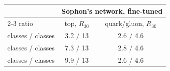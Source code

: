 \begin{table}[t]
\par\bigskip
\begin{tabular*}{\linewidth}{@{\extracolsep{\fill}}lcc@{}}
\toprule
 & \multicolumn{2}{c}{Sophon's network, fine-tuned} \\
\cmidrule(lr){2-3}
ratio & top, $R_{30}$ & quark/gluon, $R_{30}$ \\
\midrule
\Kres{} classes / \Kfull{} classes & 3.2 / 13 & 2.6 / 4.6 \\
\Kmid{} classes / \Kfull{} classes & 7.3 / 13 & 2.8 / 4.6 \\
\Kcoarse{} classes / \Kfull{} classes & 9.9 / 13 & 2.6 / 4.6 \\
\bottomrule
\end{tabular*}
\end{table}
